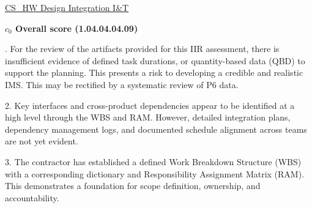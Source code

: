 % 


\begin{frame}{\href{run:../local/source-docs/1.04.04.04.09.pdf}{CS\_HW Design Integration I\&T}}
\centering
{}
\par
\vspace{0.75em}
\textbf{\small{\(c_0\) Overall score {\tiny (1.04.04.04.09)}}}\\\par
\vspace{0.5em}
\begin{minipage}{0.85\textwidth}
\raggedright
\fontsize{7}{9}. For the review of the artifacts provided for this IIR assessment, there is insufficient evidence of defined task durations, or quantity-based data (QBD) to support the planning. This presents a risk to developing a credible and realistic IMS. This may be rectified by a systematic review of P6 data.\par\vspace{0.5em}2. Key interfaces and cross-product dependencies appear to be identified at a high level through the WBS and RAM. However, detailed integration plans, dependency management logs, and documented schedule alignment across teams are not yet evident.\par\vspace{0.5em}3. The contractor has established a defined Work Breakdown Structure (WBS) with a corresponding dictionary and Responsibility Assignment Matrix (RAM). This demonstrates a foundation for scope definition, ownership, and accountability.\par
\end{minipage}
\end{frame}
